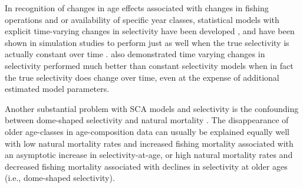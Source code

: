 In recognition of changes in age effects associated with changes in fishing operations and or availability of specific year classes, statistical models with explicit time-varying changes in selectivity have been developed \citep[e.g.,][]{butterworth2003statistical}, and have been shown in simulation studies to perform just as well when the true selectivity is actually constant over time \citep{radomski2005comparison}. \cite{radomski2005comparison} also demonstrated time varying changes in selectivity performed much better than constant selectivity models when in fact the true selectivity does change over time, even at the expense of additional estimated model parameters.  

Another substantial problem with SCA models and selectivity is the confounding between dome-shaped selectivity and natural mortality \citep[e.g.,][]{thompson1994confounding}.  The disappearance of older age-classes in age-composition data can usually be explained equally well with low natural mortality rates and increased fishing mortality associated with an asymptotic increase in selectivity-at-age, or high natural mortality rates and decreased fishing mortality associated with declines in selectivity at older ages (i.e., dome-shaped selectivity).  

\citep{aanes2007estimation}